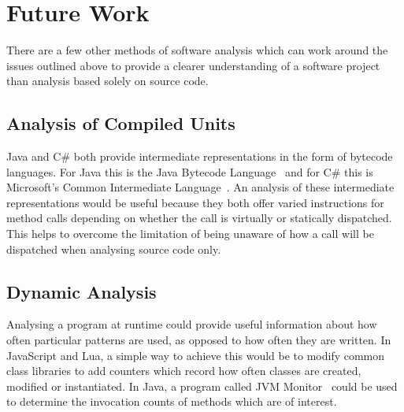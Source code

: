 \section{Future Work}
There are a few other methods of software analysis which can work around the issues outlined above to provide a clearer understanding of a software project than analysis based solely on source code.

\subsection{Analysis of Compiled Units}
Java and C\# both provide intermediate representations in the form of bytecode languages. For Java this is the Java Bytecode Language~\cite{JVMSpec} and for C\# this is Microsoft's Common Intermediate Language~\cite{CommonIntermediateLanguage}. An analysis of these intermediate representations would be useful because they both offer varied instructions for method calls depending on whether the call is virtually or statically dispatched. This helps to overcome the limitation of being unaware of how a call will be dispatched when analysing source code only.

\subsection{Dynamic Analysis}
Analysing a program at runtime could provide useful information about how often particular patterns are used, as opposed to how often they are written. In JavaScript and Lua, a simple way to achieve this would be to modify common class libraries to add counters which record how often classes are created, modified or instantiated. In Java, a program called JVM Monitor~\cite{JVMMonitor} could be used to determine the invocation counts of methods which are of interest.